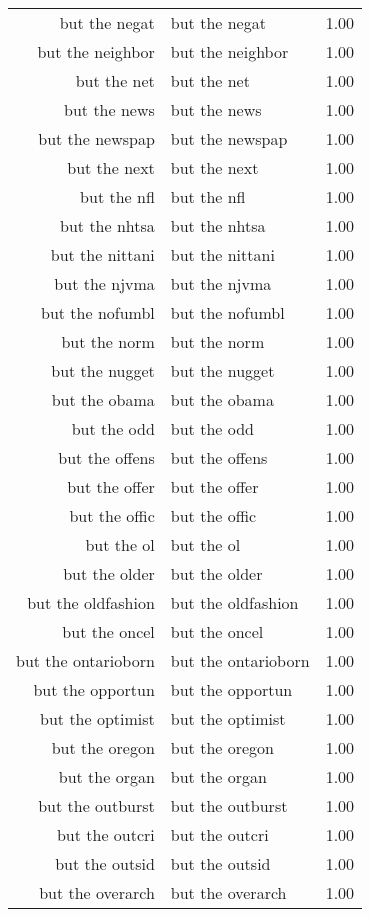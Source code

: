 \begin{table}[ht]
\begin{tabular}{rlr}
  but the negat & but the negat & 1.00 \\ 
  but the neighbor & but the neighbor & 1.00 \\ 
  but the net & but the net & 1.00 \\ 
  but the news & but the news & 1.00 \\ 
  but the newspap & but the newspap & 1.00 \\ 
  but the next & but the next & 1.00 \\ 
  but the nfl & but the nfl & 1.00 \\ 
  but the nhtsa & but the nhtsa & 1.00 \\ 
  but the nittani & but the nittani & 1.00 \\ 
  but the njvma & but the njvma & 1.00 \\ 
  but the nofumbl & but the nofumbl & 1.00 \\ 
  but the norm & but the norm & 1.00 \\ 
  but the nugget & but the nugget & 1.00 \\ 
  but the obama & but the obama & 1.00 \\ 
  but the odd & but the odd & 1.00 \\ 
  but the offens & but the offens & 1.00 \\ 
  but the offer & but the offer & 1.00 \\ 
  but the offic & but the offic & 1.00 \\ 
  but the ol & but the ol & 1.00 \\ 
  but the older & but the older & 1.00 \\ 
  but the oldfashion & but the oldfashion & 1.00 \\ 
  but the oncel & but the oncel & 1.00 \\ 
  but the ontarioborn & but the ontarioborn & 1.00 \\ 
  but the opportun & but the opportun & 1.00 \\ 
  but the optimist & but the optimist & 1.00 \\ 
  but the oregon & but the oregon & 1.00 \\ 
  but the organ & but the organ & 1.00 \\ 
  but the outburst & but the outburst & 1.00 \\ 
  but the outcri & but the outcri & 1.00 \\ 
  but the outsid & but the outsid & 1.00 \\ 
  but the overarch & but the overarch & 1.00 \\ 

\end{tabular}
\end{table}
